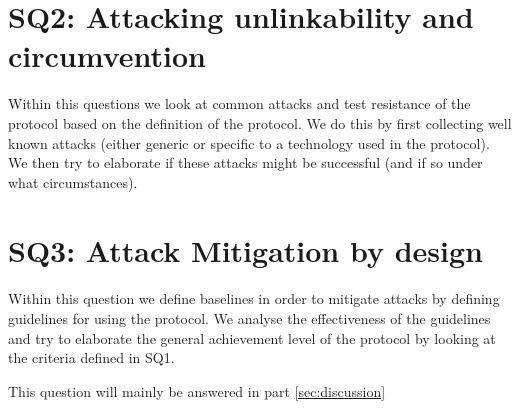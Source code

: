 \section{SQ2: Attacking unlinkability and circumvention}
Within this questions we look at common attacks and test resistance of the protocol based on the definition of the protocol. We do this by first collecting well known attacks (either generic or specific to a technology used in the protocol). We then try to elaborate if these attacks might be successful (and if so under what circumstances).

\section{SQ3: Attack Mitigation by design}
Within this question we define baselines in order to mitigate attacks by defining guidelines for using the protocol. We analyse the effectiveness of the guidelines and try to elaborate the general achievement level of the protocol by looking at the criteria defined in SQ1. 

This question will mainly be answered in part \ref{sec:discussion}

